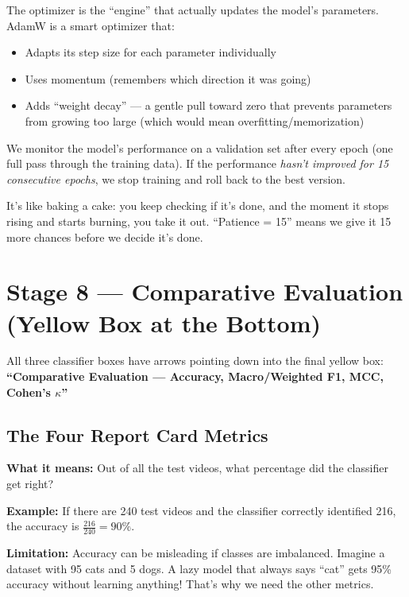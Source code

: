\documentclass[12pt, a4paper]{article}
\begin{document}
\begin{keybox}
The optimizer is the ``engine'' that actually updates the model's parameters. AdamW is a smart optimizer that:
\begin{itemize}
    \item Adapts its step size for each parameter individually
    \item Uses momentum (remembers which direction it was going)
    \item Adds ``weight decay'' — a gentle pull toward zero that prevents parameters from growing too large (which would mean overfitting/memorization)
\end{itemize}
\end{keybox}

\begin{keybox}[5. Early Stopping (Patience = 15)]
We monitor the model's performance on a validation set after every epoch (one full pass through the training data). If the performance \textit{hasn't improved for 15 consecutive epochs}, we stop training and roll back to the best version.

It's like baking a cake: you keep checking if it's done, and the moment it stops rising and starts burning, you take it out. ``Patience = 15'' means we give it 15 more chances before we decide it's done.
\end{keybox}

\newpage
\section{Stage 8 — Comparative Evaluation (Yellow Box at the Bottom)}

All three classifier boxes have arrows pointing down into the final yellow box: \textbf{``Comparative Evaluation — Accuracy, Macro/Weighted F1, MCC, Cohen's $\kappa$''}

\subsection{The Four Report Card Metrics}

\begin{keybox}
\textbf{What it means:} Out of all the test videos, what percentage did the classifier get right?

\textbf{Example:} If there are 240 test videos and the classifier correctly identified 216, the accuracy is $\frac{216}{240} = 90\%$.

\textbf{Limitation:} Accuracy can be misleading if classes are imbalanced. Imagine a dataset with 95 cats and 5 dogs. A lazy model that always says ``cat'' gets 95\% accuracy without learning anything! That's why we need the other metrics.
\end{keybox}
\end{document}
